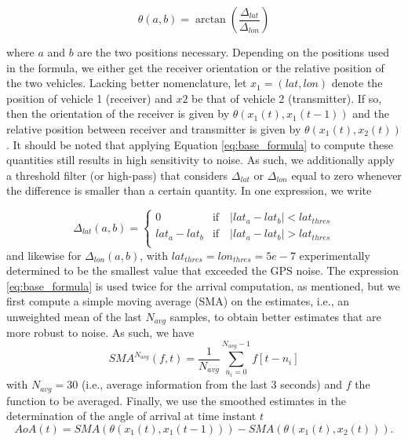 \documentclass[10pt,comsoc]{IEEEtran}
\begin{document}
\begin{equation} \label{eq:base_formula}
    \theta\left(a, b\right) = \arctan{\left(\frac{\Delta_{lat}}{\Delta_{lon}}\right)}
\end{equation}

where $a$ and $b$ are the two positions necessary. Depending on the positions used in the formula, we either get the receiver orientation or the relative position of the two vehicles. Lacking better nomenclature, let $x_1 = (lat, lon)$ denote the position of vehicle 1 (receiver) and $x2$ be that of vehicle 2 (transmitter). If so, then the orientation of the receiver is given by $\theta\left(x_1(t), x_1(t-1)\right)$ and the relative position between receiver and transmitter is given by $\theta\left(x_1(t), x_2(t)\right)$. It should be noted that applying Equation \eqref{eq:base_formula} to compute these quantities still results in high sensitivity to noise. As such, we additionally apply a threshold filter (or high-pass) that considers $\Delta_{lat}$ or $\Delta_{lon}$ equal to zero whenever the difference is smaller than a certain quantity. In one expression, we write

\begin{equation}
    \Delta_{lat}(a,b) = 
    \left\{\begin{matrix}
    0 &\text{if} \quad \left |lat_a - lat_b \right| < lat_{thres} \\
    lat_a - lat_b &\text{if} \quad \left |lat_a - lat_b \right| > lat_{thres} \\
    \end{matrix}\right.
\end{equation}
and likewise for $\Delta_{lon}(a,b)$, with $lat_{thres} = lon_{thres} = 5e-7$ experimentally determined to be the smallest value that exceeded the GPS noise. The expression \eqref{eq:base_formula} is used twice for the arrival computation, as mentioned, but we first compute a simple moving average (SMA) on the estimates, i.e., an unweighted mean of the last $N_{avg}$ samples, to obtain better estimates that are more robust to noise. As such, we have
\begin{equation} \label{eq:moving_avg}
    SMA^{N_{avg}} (f, t) = \frac{1}{N_{avg}}\sum_{n_i=0}^{N_{avg}-1} f[t-n_i]
\end{equation}
with $N_{avg} = 30$ (i.e., average information from the last 3 seconds) and $f$ the function to be averaged. Finally, we use the smoothed estimates in the determination of the angle of arrival at time instant $t$
\begin{equation} \label{eq:aoa}
    AoA(t) = SMA(\theta(x_1(t), x_1(t-1))) - SMA(\theta(x_1(t), x_2(t))).
\end{equation}
\end{document}
